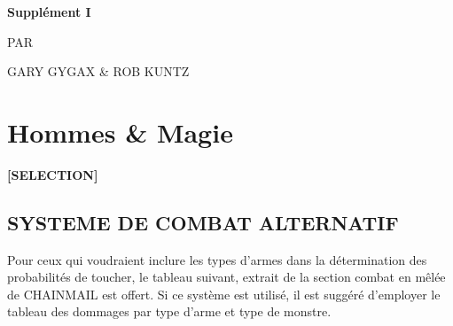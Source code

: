 \newpage
{}\begin{center}
{\Huge {}}{\normalsize \textsuperscript{\sffamily\textregistered}}

\vspace{1.8cm}

{\Large \textbf{Supplément I}}

\vspace{1.3cm}

{\Huge {}}

\vspace{5cm}

{\large PAR

\vspace{0.1cm}

GARY GYGAX \& ROB KUNTZ}
\end{center}

\newpage


\section*{Hommes \& Magie}

\begin{center}
\textbf{[SELECTION]}
\end{center}

\subsection*{SYSTEME DE COMBAT ALTERNATIF}
\label{combat-alternatif}

Pour ceux qui voudraient inclure les types d'armes dans la détermination des probabilités de toucher, le tableau suivant, extrait de la section \og combat en mêlée \fg{} de CHAINMAIL est offert. Si ce système est utilisé, il est suggéré d'employer le tableau des dommages par type d'arme et type de monstre.

